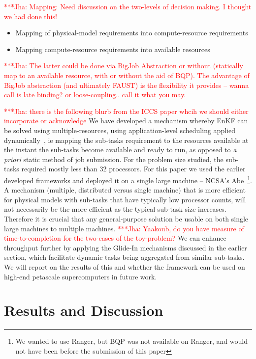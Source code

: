 \documentclass[conference,final]{IEEEtran}
\newcommand{\jhanote}[1]{ {\textcolor{red} { ***Jha: #1 }}}
\begin{document}
\jhanote{Mapping: Need discussion on the two-levels of decision
  making. I thought we had done this!}

\begin{itemize}
\item Mapping of physical-model requirements into compute-resource requirements
\item Mapping compute-resource requirements into available resources
\end{itemize}
\jhanote{The latter could be done via BigJob Abstraction or without
  (statically map to an available resource, with or without the aid of
  BQP).  The advantage of BigJob abstraction (and ultimately FAUST) is
  the flexibility it provides -- wanna call is late binding? or
  loose-coupling..  call it what you may.}

\jhanote{there is the following blurb from the ICCS paper whcih we
  should either incorporate or acknowledge} We have developed a
mechanism whereby EnKF can be solved using multiple-resources, using
application-level scheduling applied dynamically~\cite{saga_tg08}, ie
mapping the sub-tasks requirement to the resources available at the
instant the sub-tasks become available and ready to run, as opposed to
{\it a priori} static method of job submission.  For the problem size
studied, the sub-tasks required mostly less than 32 processors. For
this paper we used the earlier developed frameworks and deployed it on
a single large machine -- NCSA's Abe~\footnote{We wanted to use
  Ranger, but BQP was not available on Ranger, and would not have been
  before the submission of this paper}.  A mechanism (multiple,
distributed versus single machine) that is more efficient for physical
models with sub-tasks that have typically low processor counts, will
not necessarily be the more efficient as the typical sub-task size
increases. Therefore it is crucial that any general-purpose solution
be usable on both single large machines to multiple machines.
\jhanote{Yaakoub, do you have measure of time-to-completion for the
  two-cases of the toy-problem?}  We can enhance throughput further by
applying the Glide-In mechanisms discussed in the earlier section,
which facilitate dynamic tasks being aggregated from similar
sub-tasks. We will report on the results of this and whether the
framework can be used on high-end petascale supercomputers in future
work.


\section{Results and Discussion}
\end{document}
